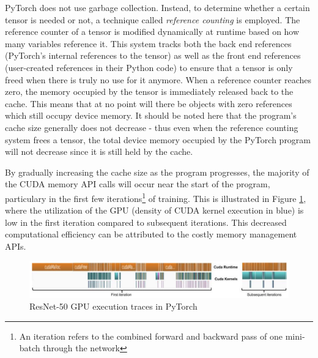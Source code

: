\documentclass[12pt,letterpaper]{article}
\begin{document}
PyTorch does not use garbage collection. Instead, to determine whether a certain tensor is needed or not, a technique called \textit{reference counting} is employed. The reference counter of a tensor is modified dynamically at runtime based on how many variables reference it. This system tracks both the back end references (PyTorch's internal references to the tensor) as well as the front end references (user-created references in their Python code) to ensure that a tensor is only freed when there is truly no use for it anymore. When a reference counter reaches zero, the memory occupied by the tensor is immediately released back to the cache. This means that at no point will there be objects with zero references which still occupy device memory. It should be noted here that the program's cache size generally does not decrease - thus even when the reference counting system frees a tensor, the total device memory occupied by the PyTorch program will not decrease since it is still held by the cache.
\par 

By gradually increasing the cache size as the program progresses, the majority of the CUDA memory API calls will occur near the start of the program, particulary in the first few iterations\footnote{An iteration refers to the combined forward and backward pass of one mini-batch through the network} of training. This is illustrated in Figure \ref{fig:cuda_memory_kernels}, where the utilization of the GPU (density of CUDA kernel execution in blue) is low in the first iteration compared to subsequent iterations. This decreased computational efficiency can be attributed to the costly memory management APIs.
\begin{figure}[ht]
\centering
\includegraphics[width=.9\textwidth]{cuda_kernel_caching.png}
\captionsetup{width=0.7\linewidth}
\caption{ResNet-50 GPU execution traces in PyTorch \cite{pytorch_paper}}
\label{fig:cuda_memory_kernels}
\end{figure}

 
%
%
\end{document}
